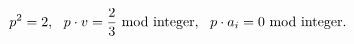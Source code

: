 \begin{equation}
p^2=2,\ \ p\cdot v=\frac23\ {\rm mod\ integer},\ \ p\cdot a_i=0
\ {\rm mod\ integer}.
\end{equation}

